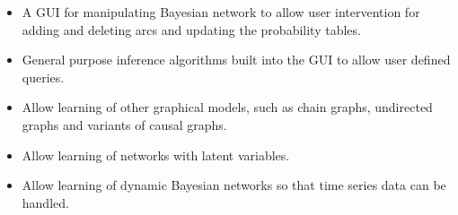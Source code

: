\begin{itemize}
\item A GUI for manipulating Bayesian network to allow user intervention for
adding and deleting arcs and updating the probability tables.

\item General purpose inference algorithms built into the GUI to allow user
defined queries.

\item Allow learning of other graphical models, such as chain graphs,
undirected graphs and variants of causal graphs.

\item Allow learning of networks with latent variables.

\item Allow learning of dynamic Bayesian networks so that time series data
can be handled.
\end{itemize}

